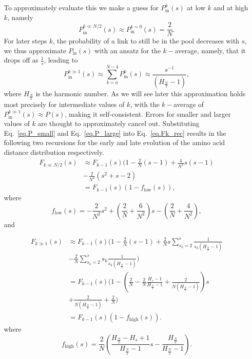 \documentclass[
reprint,
twocolumn,
amsmath,amssymb,superscriptaddress,aps,
pre]{revtex4-1}
\newcommand{\Pin}{P_{\mathrm{in}}}
\newcommand{\fhigh}{f_{\mathrm{high}}}
\newcommand{\flow}{f_{\mathrm{low}}}
\begin{document}
To approximately evaluate this we make a guess for $\Pin^k(s)$ at low $k$ and at high $k$, namely
\begin{equation}
    \Pin^{k\ll N/2}(s)\approx \Pin^{k=0}(s)=\frac{2}{N}.
    \label{eq.P_small}
\end{equation}
For later steps $k$, the probability of a link to still be in the pool decreases with $s$, 
we thus approximate $\Pin(s)$ with an ansatz for the $k-$average, namely, that it drops off as $\frac{1}{s}$, leading to
\begin{equation}
    \Pin^{k\gg 1}(s)\approx \sum_{k=a}^{N-4}\Pin^{k}(s)
    \approx \frac{s^{-1}}{ (H_{\frac{N}{2}}-1)},
    \label{eq.P_large}
\end{equation}
where $H_{\frac{N}{2}}$ is the harmonic number. 
As we will see later this approximation holds most precisely for intermediate values of $k$, with the $k-$average of $\Pin^{k\gg 1}(s)\approx P(s)$, making it self-consistent. Errors for smaller and larger values of $k$ are thought to approximately cancel out.
Substituting Eq.~\ref{eq.P_small} and Eq.~\ref{eq.P_large} into Eq.~\ref{eq.Fk_rec} results in the following two recursions for the early and late evolution of the amino acid distance distribution respectively.
\begin{align}
   F_{k\ll N/2}(s)&\approx 
   F_{k-1}(s)(1-\frac{2}{N} (s-1) 
   +\frac{4}{N^2} s (s-1)\nonumber \\
   &-\frac{2}{N^2}(s^2+s-2)\nonumber \\
   &=F_{k-1}(s)(1-\flow(s)),
   \label{eq.Fk_rec_low}
\end{align}
where 
\[\flow(s)=-\frac{2}{N^2}s^2+\left(\frac{2}{N}+\frac{6}{N^2}\right)s-\left(\frac{2}{N}+\frac{4}{N^2}\right),\]
and


\begin{align}
   F_{k\gg1}(s)&\approx 
   F_{k-1}(s)(1-\frac{2}{N} (s-1) 
   +\frac{2}{N} s \sum_{s_k=2}^{s}\frac{1}{s_k(H_{\frac{N}{2}}-1)}\nonumber\\
   &-\frac{2}{N}
   \sum_{s_k=2}^{s} s_k \frac{1}{s_k(H_{\frac{N}{2}}-1)})\nonumber \\
   &=
   F_{k-1}(s)(1 -(\frac{2}{N}-\frac{2}{N}\frac{H_{s}-1}{H_{\frac{N}{2}}-1}+\frac{2}{N(H_{\frac{N}{2}}-1)})s \nonumber \\ 
   &+ \frac{2}{N(H_{\frac{N}{2}}-1)} + \frac{2}{N})\nonumber \\
   &=F_{k-1}(s)(1-\fhigh(s)).
   \label{eq.Fk_rec_high}
\end{align}
where 
\[\fhigh(s)=\frac{2}{N}(\frac{H_{\frac{N}{2}}-H_{s}+1}{H_{\frac{N}{2}}-1}s-\frac{H_{\frac{N}{2}}}{H_{\frac{N}{2}}-1}).\]
\end{document}
